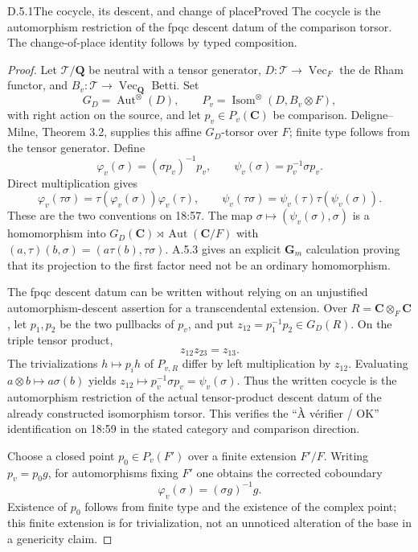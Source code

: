 \begin{result}{D.5.1}{The cocycle, its descent, and change of place}{Proved}
The cocycle is the automorphism restriction of the fpqc descent datum of the comparison torsor. The change-of-place identity follows by typed composition.
\end{result}
\begin{proof}
Let
\(\mathcal T/\mathbf Q\) be neutral with a tensor generator,
\(D:\mathcal T\to\operatorname{Vec}_F\) the de Rham functor,
and \(B_v:\mathcal T\to\operatorname{Vec}_{\mathbf Q}\) Betti.
Set
\[
G_D=\operatorname{Aut}^{\otimes}(D),\qquad
P_v=\operatorname{Isom}^{\otimes}(D,B_v\otimes F),
\]
with right action on the source, and let \(p_v\in P_v(\mathbf C)\)
be comparison. Deligne--Milne, Theorem 3.2, supplies this affine
\(G_D\)-torsor over \(F\); finite type follows from the tensor
generator. Define
\[
\varphi_v(\sigma)=(\sigma p_v)^{-1}p_v,\qquad
\psi_v(\sigma)=p_v^{-1}\sigma p_v.
\]
Direct multiplication gives
\[
\varphi_v(\tau\sigma)=\tau(\varphi_v(\sigma))\varphi_v(\tau),
\qquad
\psi_v(\tau\sigma)=\psi_v(\tau)\tau(\psi_v(\sigma)).
\]
These are the two conventions on 18:57. The map
\(\sigma\mapsto(\psi_v(\sigma),\sigma)\) is a homomorphism into
\(G_D(\mathbf C)\rtimes\operatorname{Aut}(\mathbf C/F)\) with
\((a,\tau)(b,\sigma)=(a\tau(b),\tau\sigma)\). A.5.3 gives an
explicit \(\mathbf G_m\) calculation proving that its projection
to the first factor need not be an ordinary homomorphism.

The fpqc descent datum can be written without relying on an
unjustified automorphism-descent assertion for a transcendental
extension. Over \(R=\mathbf C\otimes_F\mathbf C\), let \(p_1,p_2\)
be the two pullbacks of \(p_v\), and put
\(z_{12}=p_1^{-1}p_2\in G_D(R)\). On the triple tensor product,
\[
z_{12}z_{23}=z_{13}.
\]
The trivializations \(h\mapsto p_i h\) of \(P_{v,R}\) differ by
left multiplication by \(z_{12}\). Evaluating
\(a\otimes b\mapsto a\sigma(b)\) yields
\(z_{12}\mapsto p_v^{-1}\sigma p_v=\psi_v(\sigma)\).
Thus the written cocycle is the automorphism restriction of the
actual tensor-product descent datum of the already constructed
isomorphism torsor. This verifies the ``À vérifier / OK'' identification
on 18:59 in the stated category and comparison direction.

Choose a closed point \(p_0\in P_v(F')\) over a finite extension
\(F'/F\). Writing \(p_v=p_0g\), for automorphisms fixing \(F'\)
one obtains the corrected coboundary
\[
\varphi_v(\sigma)=(\sigma g)^{-1}g.
\]
Existence of \(p_0\) follows from finite type and the existence of
the complex point; this finite extension is for trivialization,
not an unnoticed alteration of the base in a genericity claim.


\end{proof}
